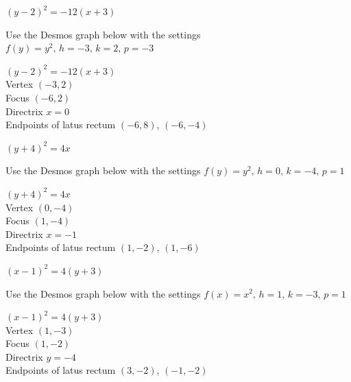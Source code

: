 \documentclass{ximera}
\begin{document}
\begin{question}
\begin{problem}\label{paranotfcnone} 
    $(y - 2)^{2} = -12(x + 3)$ 

\begin{solution}
Use the Desmos graph below with the settings $f(y)=y^2,\,h=-3,\,k=2,\,p=-3$

\begin{center} 
\end{center}
{$(y - 2)^{2} = -12(x + 3)$} \\
{Vertex $(-3, 2)$} \\
{Focus $(-6, 2)$} \\
{Directrix $x = 0$}\\
{Endpoints of latus rectum $(-6, 8)$, $(-6, -4)$}\\
\end{solution}
\end{problem}

\begin{problem}\label{paranotfcntwo} 
    $(y + 4)^{2} = 4x$

\begin{solution}
Use the Desmos graph below with the settings $f(y)=y^2,\,h=0,\,k=-4,\,p=1$

\begin{center} 
\end{center}
{$(y + 4)^{2} = 4x$}\\
{Vertex $(0,-4)$} \\
{Focus $(1,-4)$} \\
{Directrix $x = -1$}\\
{Endpoints of latus rectum $(1, -2)$, $(1, -6)$}\\
\end{solution}
\end{problem}


\begin{problem}
     $(x-1)^2 = 4(y+3)$

\begin{solution}
Use the Desmos graph below with the settings $f(x)=x^2,\,h=1,\,k=-3,\,p=1$

\begin{center} 
\end{center}
{$(x-1)^2 = 4(y+3)$}\\
{Vertex $\left(1, -3\right)$}\\
{Focus $\left(1, -2 \right)$}\\
{Directrix $y = -4$}\\
{Endpoints of latus rectum $\left(3, -2 \right)$, $\left(-1, -2 \right)$}\\
\end{solution} 
\end{problem}


\end{question}
\end{document}
